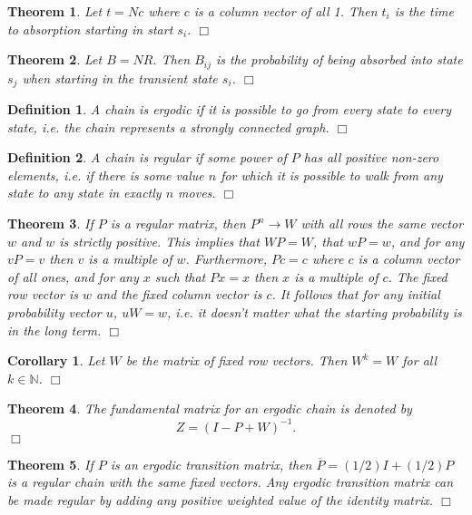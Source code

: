 \documentclass[11pt, letterpaper]{article}
\newenvironment{definition}
{\noindent\begin{defn}}
{\hfill $\Box$ \end{defn}}
\newtheorem{defn}{Definition}
\newenvironment{theorem}
{\noindent\begin{thm}}
{\hfill $\Box$ \end{thm}}
\newtheorem{thm}{Theorem}
\newenvironment{corollary}
{\noindent\begin{cor}}
{\hfill $\Box$ \end{cor}}
\newtheorem{cor}{Corollary}
\newcommand{\NN}{\mathbb{N}}
\begin{document}
\begin{theorem}
Let $t = Nc$ where $c$ is a column vector of all 1.  Then $t_i$ is the time to absorption starting in start $s_i$.
\end{theorem}

\begin{theorem}
Let $B = NR$.  Then $B_{ij}$ is the probability of being absorbed into state $s_j$ when starting in the transient state $s_i$.
\end{theorem}

\begin{definition}
A chain is \textit{ergodic} if it is possible to go from every state to every state, i.e. the chain represents a strongly connected graph.
\end{definition}

\begin{definition}
A chain is \textit{regular} if some power of $P$ has all positive non-zero elements, i.e. if there is some value $n$ for which it is possible to walk from any state to any state in exactly $n$ moves.
\end{definition}

\begin{theorem}
If $P$ is a regular matrix, then $P^n \rightarrow W$ with all rows the same vector $w$ and $w$ is strictly positive.  This implies that $WP = W$, that $wP = w$, and for any $vP=v$ then $v$ is a multiple of $w$.  Furthermore, $Pc = c$ where $c$ is a column vector of all ones, and for any $x$ such that $Px = x$ then $x$ is a multiple of $c$. The \textit{fixed row vector} is $w$ and the \textit{fixed column vector} is $c$. It follows that for any initial probability vector $u$, $uW = w$, i.e. it doesn't matter what the starting probability is in the long term.
\end{theorem}

\begin{corollary}
Let $W$ be the matrix of fixed row vectors. Then $W^k = W$ for all $k \in \NN$.
\end{corollary}

\begin{theorem}
The fundamental matrix for an ergodic chain is denoted by
\[
	Z = (I-P+W)^{-1}.
\]
\end{theorem}



\begin{theorem}
If $P$ is an ergodic transition matrix, then $\overline{P} = (1/2)I + (1/2)P$ is a regular chain with the same fixed vectors.  Any ergodic transition matrix can be made regular by adding any positive weighted value of the identity matrix.
\end{theorem}
\end{document}
